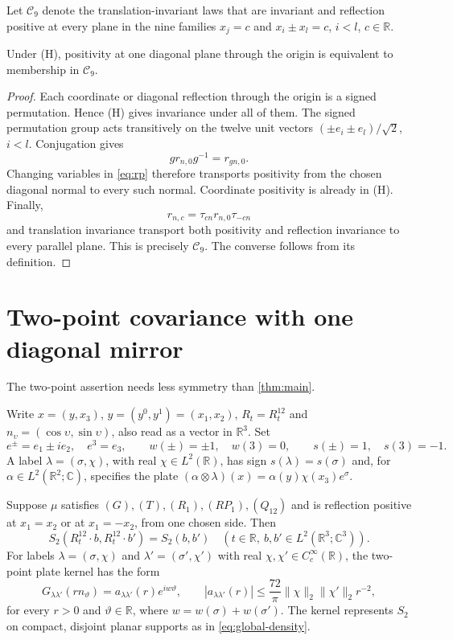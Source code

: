 \documentclass[11pt,letterpaper,reqno]{amsart}
\makeatletter
\theoremstyle{definition}
\newcommand{\ms@majorstart}{%
  \pushQED{\qed}\renewcommand{\qedsymbol}{$\blacksquare\square$}}
\newcommand{\ms@minorstart}{%
  \pushQED{\qed}\renewcommand{\qedsymbol}{$\blacksquare$}}
\newenvironment{theorem}[1][]{\ms@majorstart\ms@theorem[#1]}
  {\popQED\endms@theorem}
\newenvironment{lemma}[1][]{\ms@minorstart\ms@lemma[#1]}
  {\popQED\endms@lemma}
\theoremstyle{remark}
\newcommand{\R}{\mathbb R}\newcommand{\C}{\mathbb C}
\makeatother
\begin{document}
Let $\mathcal C_9$ denote the translation-invariant laws that are
invariant and reflection positive at every plane in the nine families
$x_j=c$ and $x_i\pm x_l=c$, $i<l$, $c\in\R$.

\begin{lemma}[Transport of diagonal positivity]\label{lem:transport}
Under (H), positivity at one diagonal plane through the origin is
equivalent to membership in $\mathcal C_9$.
\end{lemma}

\begin{proof}
Each coordinate or diagonal reflection through the origin is a signed
permutation. Hence (H) gives invariance under all of them. The signed
permutation group acts transitively on the twelve unit vectors
$(\pm e_i\pm e_l)/\sqrt2$, $i<l$. Conjugation gives
\[
 g r_{n,0}g^{-1}=r_{gn,0}.
\]
Changing variables in \eqref{eq:rp} therefore transports positivity
from the chosen diagonal normal to every such normal. Coordinate
positivity is already in (H). Finally,
\[
 r_{n,c}=\tau_{cn}r_{n,0}\tau_{-cn}
\]
and translation invariance transport both positivity and reflection
invariance to every parallel plane. This is precisely $\mathcal C_9$.
The converse follows from its definition.
\end{proof}

\section{Two-point covariance with one diagonal mirror}\label{sec:two-point}

The two-point assertion needs less symmetry than \cref{thm:main}.

Write $x=(y,x_3)$, $y=(y^0,y^1)=(x_1,x_2)$, $R_t=R^{12}_t$ and
$n_\upsilon=(\cos\upsilon,\sin\upsilon)$, also read as a vector in
$\R^3$. Set
\[
 e^\pm=e_1\pm ie_2,\quad e^3=e_3,\qquad
 w(\pm)=\pm1,\quad w(3)=0,\qquad s(\pm)=1,\quad s(3)=-1.
\]
A label $\lambda=(\sigma,\chi)$, with real $\chi\in L^2(\R)$, has sign
$s(\lambda)=s(\sigma)$ and, for $\alpha\in L^2(\R^2;\C)$, specifies the plate
$(\alpha\otimes\lambda)(x)=\alpha(y)\chi(x_3)e^\sigma$.

\begin{theorem}\label{thm:weak-two-point}
Suppose $\mu$ satisfies $(G),(T),(R_1),(RP_1),(Q_{12})$ and is
reflection positive at $x_1=x_2$ or at $x_1=-x_2$, from one chosen
side. Then
\[
 S_2(R^{12}_t\cdot b,R^{12}_t\cdot b')=S_2(b,b')
 \quad(t\in\R,\ b,b'\in L^2(\R^3;\C^3)).
\]
For labels $\lambda=(\sigma,\chi)$ and
$\lambda'=(\sigma',\chi')$ with real $\chi,\chi'\in C_c^\infty(\R)$,
the two-point plate kernel has the form
\[
 G_{\lambda\lambda'}(rn_\vartheta)
   =a_{\lambda\lambda'}(r)e^{iw\vartheta},\qquad
 |a_{\lambda\lambda'}(r)|\le\frac{72}{\pi}
       \|\chi\|_2\|\chi'\|_2 r^{-2},
\]
for every $r>0$ and $\vartheta\in\R$, where
$w=w(\sigma)+w(\sigma')$. The kernel represents $S_2$ on compact,
disjoint planar supports as in \eqref{eq:global-density}.
\end{theorem}
\end{document}
